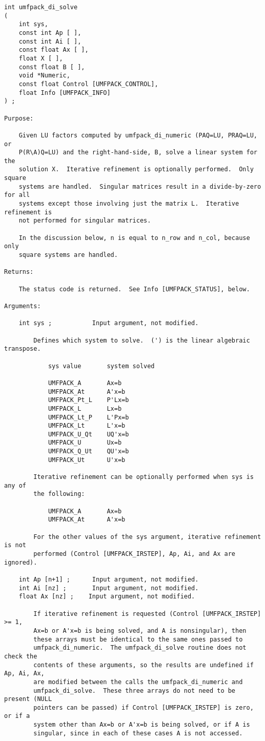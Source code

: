 \documentclass[11pt]{article}
\begin{document}
{\footnotesize
\begin{verbatim}
int umfpack_di_solve
(
    int sys,
    const int Ap [ ],
    const int Ai [ ],
    const float Ax [ ],
    float X [ ],
    const float B [ ],
    void *Numeric,
    const float Control [UMFPACK_CONTROL],
    float Info [UMFPACK_INFO]
) ;

Purpose:

    Given LU factors computed by umfpack_di_numeric (PAQ=LU, PRAQ=LU, or
    P(R\A)Q=LU) and the right-hand-side, B, solve a linear system for the
    solution X.  Iterative refinement is optionally performed.  Only square
    systems are handled.  Singular matrices result in a divide-by-zero for all
    systems except those involving just the matrix L.  Iterative refinement is
    not performed for singular matrices.

    In the discussion below, n is equal to n_row and n_col, because only
    square systems are handled.

Returns:

    The status code is returned.  See Info [UMFPACK_STATUS], below.

Arguments:

    int sys ;           Input argument, not modified.

        Defines which system to solve.  (') is the linear algebraic transpose.

            sys value       system solved

            UMFPACK_A       Ax=b
            UMFPACK_At      A'x=b
            UMFPACK_Pt_L    P'Lx=b
            UMFPACK_L       Lx=b
            UMFPACK_Lt_P    L'Px=b
            UMFPACK_Lt      L'x=b
            UMFPACK_U_Qt    UQ'x=b
            UMFPACK_U       Ux=b
            UMFPACK_Q_Ut    QU'x=b
            UMFPACK_Ut      U'x=b

        Iterative refinement can be optionally performed when sys is any of
        the following:

            UMFPACK_A       Ax=b
            UMFPACK_At      A'x=b

        For the other values of the sys argument, iterative refinement is not
        performed (Control [UMFPACK_IRSTEP], Ap, Ai, and Ax are ignored).

    int Ap [n+1] ;      Input argument, not modified.
    int Ai [nz] ;       Input argument, not modified.
    float Ax [nz] ;    Input argument, not modified.

        If iterative refinement is requested (Control [UMFPACK_IRSTEP] >= 1,
        Ax=b or A'x=b is being solved, and A is nonsingular), then
        these arrays must be identical to the same ones passed to
        umfpack_di_numeric.  The umfpack_di_solve routine does not check the
        contents of these arguments, so the results are undefined if Ap, Ai, Ax,
        are modified between the calls the umfpack_di_numeric and
        umfpack_di_solve.  These three arrays do not need to be present (NULL
        pointers can be passed) if Control [UMFPACK_IRSTEP] is zero, or if a
        system other than Ax=b or A'x=b is being solved, or if A is
        singular, since in each of these cases A is not accessed.


\end{verbatim}}
\end{document}
